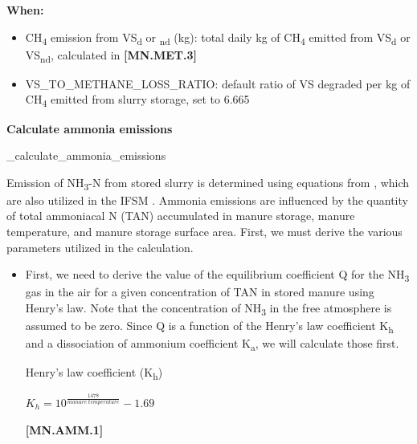 \begin{refsection}
    \textbf{When:}
    \begin{itemize}
        \item CH\textsubscript{4} emission from VS\textsubscript{d} or \textsubscript{nd} (kg): total daily kg of CH\textsubscript{4} emitted from VS\textsubscript{d} or VS\textsubscript{nd}, calculated in \textbf{[MN.MET.3]}
        \item VS\_TO\_METHANE\_LOSS\_RATIO: default ratio of VS degraded per kg of CH\textsubscript{4} emitted from slurry storage, set to 6.665

    \end{itemize}
    \vspace{0.5cm}

\textbf{Calculate ammonia emissions}

\_calculate\_ammonia\_emissions
\vspace{0.2cm}

Emission of NH\textsubscript{3}-N from stored slurry is determined using equations from \cite{Rotz2006}, which are also utilized in the IFSM \parencite{Rotz2023}. Ammonia emissions are influenced by the quantity of total ammoniacal N (TAN) accumulated in manure storage, manure temperature, and manure storage surface area. First, we must derive the various parameters utilized in the calculation.

    \begin{itemize}
        \item First, we need to derive the value of the equilibrium coefficient Q for the NH\textsubscript{3} gas in the air for a given concentration of TAN in stored manure using Henry’s law. Note that the concentration of NH\textsubscript{3} in the free atmosphere is assumed to be zero. Since Q is a function of the Henry’s law coefficient K\textsubscript{h} and a dissociation of ammonium coefficient K\textsubscript{a}, we will calculate those first. 
        \vspace{0.2cm}
        
         Henry’s law coefficient (K\textsubscript{h})
         \vspace{0.2cm}

    \begin{center}
\(K_h = 10 ^\frac{1478} {manure\ temperature }- 1.69 \)
    \end{center}
        \vspace{0.5cm} 
    
            {\raggedleft \textbf{[MN.AMM.1]}\par}
            \vspace{0.5cm}
            

\end{itemize}
\end{refsection}
